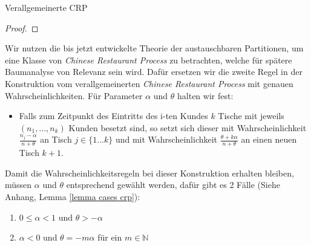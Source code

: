 \begin{section}{Verallgemeinerte CRP}
\begin{proof}
\end{proof}
Wir nutzen die bis jetzt entwickelte Theorie der austauschbaren Partitionen, um eine Klasse von \textit{Chinese Restaurant Process} zu betrachten, welche für spätere Baumanalyse von Relevanz sein wird. Dafür ersetzen wir die zweite Regel in der Konstruktion vom verallgemeinerten \textit{Chinese Restaurant Process} mit genauen Wahrscheinlichkeiten. Für Parameter $\alpha$ und $\theta$ halten wir fest:
\begin{itemize} 
    \item Falls zum Zeitpunkt des Eintritts des i-ten Kundes $k$ Tische mit jeweils $(n_1,...,n_k)$ Kunden besetzt sind, so setzt sich dieser mit Wahrscheinlichkeit $\frac{n_j-\alpha}{n + \theta}$ an Tisch $j \in \{1...k\}$ und mit Wahrscheinlichkeit $\frac{\theta + k\alpha}{n + \theta}$ an einen neuen Tisch $k+1$.
\end{itemize}
Damit die Wahrscheinlichkeitsregeln bei dieser Konstruktion erhalten bleiben, müssen $\alpha$ und $\theta$ entsprechend gewählt werden, dafür gibt es 2 Fälle (Siehe Anhang, Lemma \ref{lemma cases crp}): 
\begin{enumerate}
    \item $ 0 \leq \alpha < 1$ und $\theta > - \alpha $ 
    \item $\alpha < 0$ und $\theta = -m \alpha$ für ein $m \in \mathbb{N}$
\end{enumerate}


\end{section}
